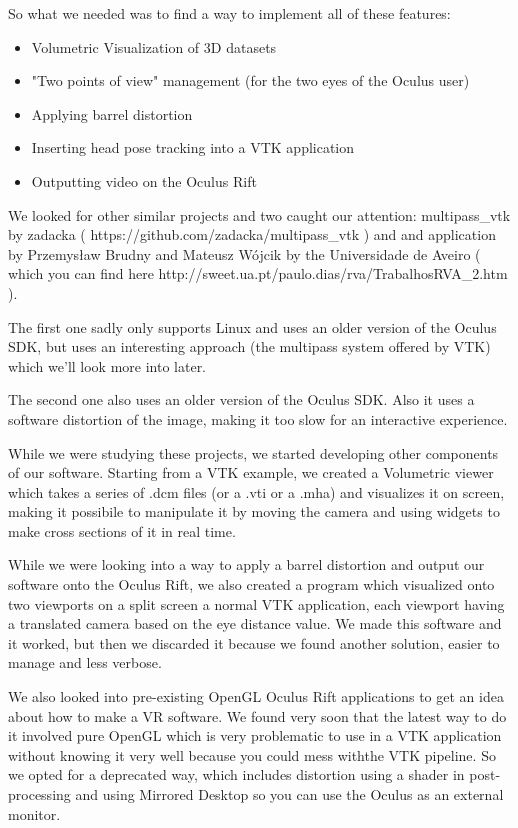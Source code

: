 \documentclass[11pt]{article} %
\begin{document}
So what we needed was to find a way to implement all of these features:
\begin{itemize}
\item Volumetric Visualization of 3D datasets
\item "Two points of view" management (for the two eyes of the Oculus user)
\item Applying barrel distortion
\item Inserting head pose tracking into a VTK application
\item Outputting video on the Oculus Rift
\end{itemize}

We looked for other similar projects and two caught our attention: multipass\_vtk by zadacka ( https://github.com/zadacka/multipass\_vtk ) and and application by  Przemysław Brudny and Mateusz Wójcik by the Universidade de Aveiro ( which you can find here http://sweet.ua.pt/paulo.dias/rva/TrabalhosRVA\_2.htm ).

The first one sadly only supports Linux and uses an older version of  the Oculus SDK, but uses an interesting approach (the multipass system offered by VTK) which we'll look more into later.

The second one also uses an older version of the Oculus SDK. Also it uses a software distortion of the image, making it too slow for an interactive experience.

While we were studying these projects, we started developing other components of our software.
Starting from a VTK example, we created a Volumetric viewer which takes a series of .dcm files (or a .vti or a .mha) and visualizes it on screen, making it possibile to manipulate it by moving the camera and using widgets to make cross sections of it in real time.

While we were looking into a way to apply a barrel distortion and output our software onto the Oculus Rift, we also created a program which visualized onto two viewports on a split screen a normal VTK application, each viewport having a translated camera based on the eye distance value. We made this software and it worked, but then we discarded it because we found another solution, easier to manage and less verbose.

We also looked into pre-existing OpenGL Oculus Rift applications to get an idea about how to make a VR software. We found very soon that the latest way to do it involved pure OpenGL which is very problematic to use in a VTK application without knowing it very well because you could mess withthe VTK pipeline. So we opted for a deprecated way, which includes distortion using a shader in post-processing and using Mirrored Desktop so you can use the Oculus as an external monitor.
\end{document}

